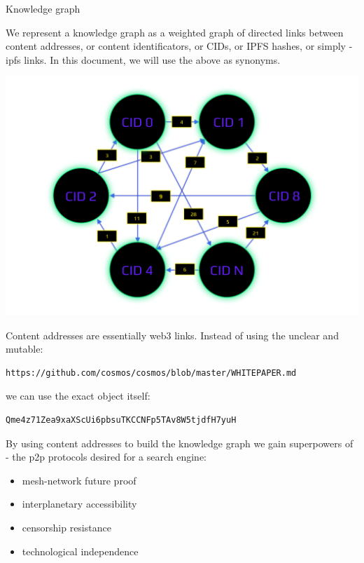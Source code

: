 \documentclass[8pt,oneside]{amsart}
\makeatletter
\newcommand{\linkred}[2]{\href{#1}{\color{red}{#2}}}
\newcommand{\linkgreen}[2]{\href{#1}{\color{green}{#2}}}
\renewcommand\subsection{\@startsection{subsection}
                                    {2}{\z@}
                                    {-3.25ex\@plus -1ex \@minus -.2ex}
                                    {0ex \@plus .2ex}
                                    {\play\Large}
                        }
\newcommand{\titleSection}[1]{\subsection{#1}}
\newenvironment{Figure}
  {\par\medskip\noindent\minipage{\linewidth}}
  {\endminipage\par\medskip}
\makeatother
\begin{document}
\titleSection{Knowledge graph}\label{knowledge-graph}

We represent a knowledge graph as a weighted graph of directed links between content addresses, or content identificators, or CIDs, or IPFS hashes, or simply - ipfs links. In this document, we will use the above as synonyms.

\begin{Figure}
    \centering
    \includegraphics[width=1\textwidth]{knowledge-graph.png}
\end{Figure}

Content addresses are essentially web3 links. Instead of using the unclear and mutable:
\begin{lstlisting}
https://github.com/cosmos/cosmos/blob/master/WHITEPAPER.md
\end{lstlisting}
we can use the exact object itself:
\begin{lstlisting}
Qme4z71Zea9xaXScUi6pbsuTKCCNFp5TAv8W5tjdfH7yuH
\end{lstlisting}

By using content addresses to build the knowledge graph we gain \linkred{https://steemit.com/web3/@hipster/an-idea-of-decentralized-search-for-web3-ce860d61defe5est}{the so much needed} superpowers of \linkgreen{https://ipfs.io/ipfs/QmV9tSDx9UiPeWExXEeH6aoDvmihvx6jD5eLb4jbTaKGps}{IPFS} - \linkgreen{https://ipfs.io/ipfs/QmXHGmfo4sjdHVW2MAxczAfs44RCpSeva2an4QvkzqYgfR}{like} the p2p protocols desired for a search engine:

\begin{itemize}
\item mesh-network future proof
\item interplanetary accessibility
\item censorship resistance
\item technological independence
\end{itemize}
\end{document}
